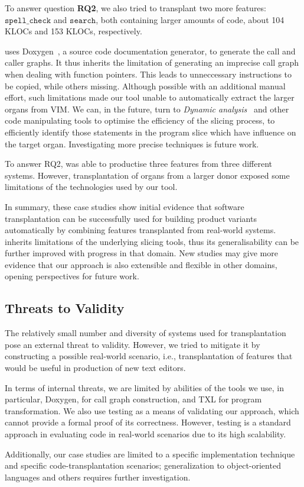 To answer question \textbf{RQ2}, we also tried to transplant two more features:  $\texttt{spell\_check}$ and $\texttt{search}$,  both containing larger amounts of code, about 104 KLOCs and 153 KLOCs, respectively.

\prodscalpel uses Doxygen~\cite{Doxygen2018}, a source code documentation generator, to generate the call and caller graphs. 
It thus inherits the limitation of generating an imprecise call graph when dealing with function pointers. 
This leads to unneccessary instructions to be copied, while others missing.
Although possible with an additional manual effort, such limitations made our tool unable to automatically extract the larger organs from VIM. 
We can, in the future, turn to \emph{Dynamic analysis}~\cite{Cornelissen2009} and other code manipulating tools to optimise the efficiency of the slicing process, to efficiently identify those statements in the program slice which have influence on the target organ. Investigating more precise techniques is future work.

\begin{framed}
\noindent To answer RQ2, \prodscalpel was able to productise three features from three different systems. However, transplantation of organs from a larger donor exposed some limitations of the technologies used by our tool.
\end{framed}

In summary, these case studies show initial evidence that software transplantation can be successfully used for building product variants automatically by combining features transplanted from real-world systems.
\prodscalpel inherits limitations of the underlying slicing tools, thus its generalisability can be further improved with progress in that domain.
New studies may give more evidence that our approach is also extensible and flexible in other domains, opening perspectives for future work.


\subsection{Threats to Validity} \label{ch-6:threats}

The relatively small number and diversity of systems used for transplantation pose an external threat to validity. However, we tried to mitigate it by constructing a possible real-world scenario, i.e., transplantation of features that would be useful in production of new text editors.

In terms of internal threats, we are limited by abilities of the tools we use, in particular, Doxygen, for call graph construction, and TXL for program transformation. We also use testing as a means of validating our approach, which cannot provide a formal proof of its correctness. However, testing is a standard approach in evaluating code in real-world scenarios due to its high scalability. 

Additionally, our case studies are limited to a specific implementation technique and specific code-transplantation scenarios; generalization to object-oriented languages and others requires further investigation. 
